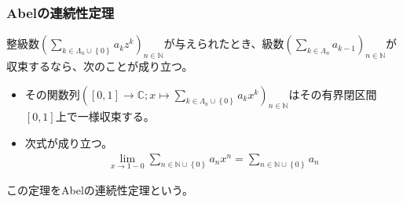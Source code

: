 \documentclass[dvipdfmx]{jsarticle}
\begin{document}
\subsubsection{Abelの連続性定理}
\begin{thm}[Abelの連続性定理]\label{4.1.13.11}
整級数$\left( \sum_{k \in \varLambda_{n} \cup \left\{ 0 \right\}} {a_{k}z^{k}} \right)_{n \in \mathbb{N}}$が与えられたとき、級数$\left( \sum_{k \in \varLambda_{n}} a_{k - 1} \right)_{n \in \mathbb{N}}$が収束するなら、次のことが成り立つ。
\begin{itemize}
\item
  その関数列$\left( [ 0,1] \rightarrow \mathbb{C};x \mapsto \sum_{k \in \varLambda_{n} \cup \left\{ 0 \right\}} {a_{k}x^{k}} \right)_{n \in \mathbb{N}}$はその有界閉区間$[ 0,1]$上で一様収束する。
\item
  次式が成り立つ。
\begin{align*}
\lim_{x \rightarrow 1 - 0}{\sum_{n \in \mathbb{N} \cup \left\{ 0 \right\}} {a_{n}x^{n}}} = \sum_{n \in \mathbb{N} \cup \left\{ 0 \right\}} a_{n}
\end{align*}
\end{itemize}
この定理をAbelの連続性定理という。
\end{thm}
\end{document}
